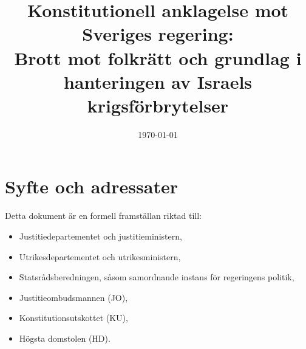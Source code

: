 \documentclass[12pt]{article}
\title{\textbf{Konstitutionell anklagelse mot Sveriges regering:\\
Brott mot folkrätt och grundlag i hanteringen av Israels krigsförbrytelser}}
\date{\today}
\begin{document}
\maketitle
\thispagestyle{empty}
\vspace{1cm}

\section{Syfte och adressater}


Detta dokument är en formell framställan riktad till:

\begin{itemize}
  \item Justitiedepartementet och justitieministern,
  \item Utrikesdepartementet och utrikesministern,
  \item Statsrådsberedningen, såsom samordnande instans för regeringens politik,
  \item Justitieombudsmannen (JO),
  \item Konstitutionsutskottet (KU),
  \item Högsta domstolen (HD).
\end{itemize}
\end{document}
